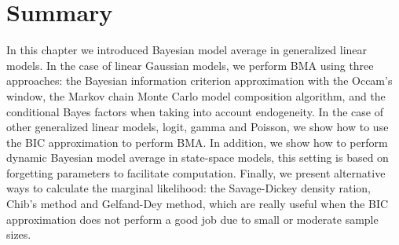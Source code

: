     

\section{Summary}\label{sec10_5}
In this chapter we introduced Bayesian model average in generalized linear models. In the case of linear Gaussian models, we perform BMA using three approaches: the Bayesian information criterion approximation with the Occam's window, the Markov chain Monte Carlo model composition algorithm, and the conditional Bayes factors when taking into account endogeneity. In the case of other generalized linear models, logit, gamma and Poisson, we show how to use the BIC approximation to perform BMA. In addition, we show how to perform dynamic Bayesian model average in state-space models, this setting is based on forgetting parameters to facilitate computation. Finally,  we present alternative ways to calculate the marginal likelihood: the Savage-Dickey density ration, Chib's method and Gelfand-Dey method, which are really useful when the BIC approximation does not perform a good job due to small or moderate sample sizes.  

